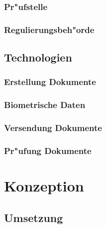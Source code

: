 \documentclass[a4paper, 12pt]{article}
\begin{document}
\subsubsection{Pr"ufstelle}
\label{sec:Pr"ufstelle}


\subsubsection{Regulierungsbeh"orde}
\label{sec:Regulierungsbeh"orde}


\subsection{Technologien}
\label{sec:Technologien}


\subsubsection{Erstellung Dokumente}
\label{sec:Erstellung Dokumente}


\subsubsection{Biometrische Daten}
\label{sec:Biometrische Daten}


\subsubsection{Versendung Dokumente}
\label{sec:Versendung Dokumente}


\subsubsection{Pr"ufung Dokumente}
\label{sec:Pr"ufung Dokumente}

\section{Konzeption}
\label{sec:Konzeption}


\subsection{Umsetzung}
\label{sec:Umsetzung}

\newpage
\end{document}
